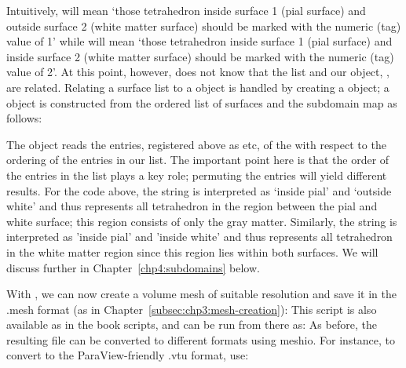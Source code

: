 Intuitively,  will mean `those tetrahedron 
inside surface 1 (pial surface) and outside surface 2 (white matter surface) 
should be marked with the numeric (tag) value of 1' while 
 will mean `those tetrahedron inside surface 1 
(pial surface) and inside surface 2 (white matter surface) should be marked 
with the numeric (tag) value of 2'.  At this point, however, \svmtk{} does not 
know that the  list and our 
 object, , are related.  Relating 
a surface list to a  object is handled by creating 
a  object; a  object is constructed  
from the ordered list of surfaces and the subdomain map as follows:
%
%

\noindent The  object reads the entries, registered above 
as  etc, of the 
 with respect to the ordering of the entries in 
our  list.  The important point here is that the 
order of the entries in the  list plays a key role; 
permuting the entries will yield different results.  %
For the code above, the string  %
is interpreted as `inside pial' and `outside white' and thus represents all 
tetrahedron in the region between the pial and white surface; this region 
consists of only the gray matter. Similarly, the string  is 
interpreted as 'inside pial' and 'inside white' and thus represents all 
tetrahedron in the white matter region since this region lies within both 
surfaces.  %
%
We will discuss  further in 
Chapter~\ref{chp4:subdomains} below.

With , we can now create a volume mesh of
suitable resolution and save it in the .mesh format (as in
Chapter~\ref{subsec:chp3:mesh-creation}):
This script is also available as  in the
book scripts, and can be run from there as:
\noindent As before, the resulting  file can be converted to different formats
using meshio. For instance, to convert to the ParaView-friendly .vtu format, use:

